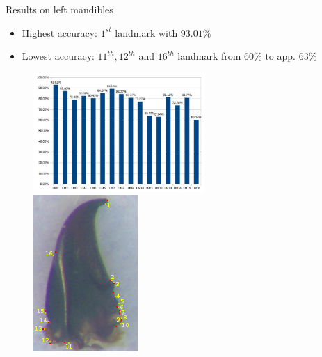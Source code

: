 \documentclass{LaBRI_poster}
\begin{document}
\begin{frame}[t]
\begin{columns}[t]
\begin{column}{\twocolwidth}
\begin{block}{Results on left mandibles}
	\begin{itemize}
  		\item Highest accuracy: $1^{st}$ landmark with \textbf{$93.01\%$}
  		\item Lowest accuracy: $11^{th}, 12^{th}$ and $16^{th}$ landmark from  $60\%$ to app. $63\%$
  	\end{itemize}
  	\begin{figure}
		\includegraphics[width=0.61\textwidth]{images/mg_chartlms}~~
		\includegraphics[scale=1.9]{images/mg_rs}
	\end{figure}
\end{block}

\end{column}

\begin{column}{\sepwidth}\end{column}
\end{columns}



\begin{columns}[t] 

\begin{column}{\sepwidth}\end{column} %


\end{columns}
\end{frame}
\end{document}
